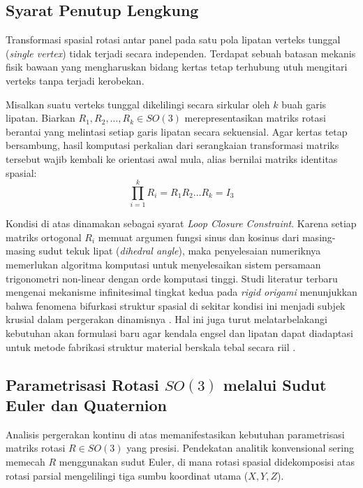 \subsection{Syarat Penutup Lengkung}
Transformasi spasial rotasi antar panel pada satu pola lipatan verteks tunggal (\textit{single vertex}) tidak terjadi secara independen. Terdapat sebuah batasan mekanis fisik bawaan yang mengharuskan bidang kertas tetap terhubung utuh mengitari verteks tanpa terjadi kerobekan.

\begin{teorema}
  Misalkan suatu verteks tunggal dikelilingi secara sirkular oleh $k$ buah garis lipatan. Biarkan $R_1, R_2, \ldots, R_k \in SO(3)$ merepresentasikan matriks rotasi berantai yang melintasi setiap garis lipatan secara sekuensial. Agar kertas tetap bersambung, hasil komputasi perkalian dari serangkaian transformasi matriks tersebut wajib kembali ke orientasi awal mula, alias bernilai matriks identitas spasial:
  \[
    \prod_{i=1}^{k} R_i = R_1 R_2 \ldots R_k = I_3
  \]
\end{teorema}
Kondisi di atas dinamakan sebagai syarat \textit{Loop Closure Constraint}. Karena setiap matriks ortogonal $R_i$ memuat argumen fungsi sinus dan kosinus dari masing-masing sudut tekuk lipat (\textit{dihedral angle}), maka penyelesaian numeriknya memerlukan algoritma komputasi untuk menyelesaikan sistem persamaan trigonometri non-linear dengan orde komputasi tinggi. Studi literatur terbaru mengenai mekanisme infinitesimal tingkat kedua pada \textit{rigid origami} menunjukkan bahwa fenomena bifurkasi struktur spasial di sekitar kondisi ini menjadi subjek krusial dalam pergerakan dinamisnya \parencite{hayakawa2023analytical, hayakawa2024rigid}. Hal ini juga turut melatarbelakangi kebutuhan akan formulasi baru agar kendala engsel dan lipatan dapat diadaptasi untuk metode fabrikasi struktur material berskala tebal secara riil \parencite{bershadsky2024framework}.

\subsection{Parametrisasi Rotasi $SO(3)$ melalui Sudut Euler dan Quaternion}
Analisis pergerakan kontinu di atas memanifestasikan kebutuhan parametrisasi matriks rotasi $R \in SO(3)$ yang presisi. Pendekatan analitik konvensional sering memecah $R$ menggunakan sudut Euler, di mana rotasi spasial didekomposisi atas rotasi parsial mengelilingi tiga sumbu koordinat utama ($X, Y, Z$).


